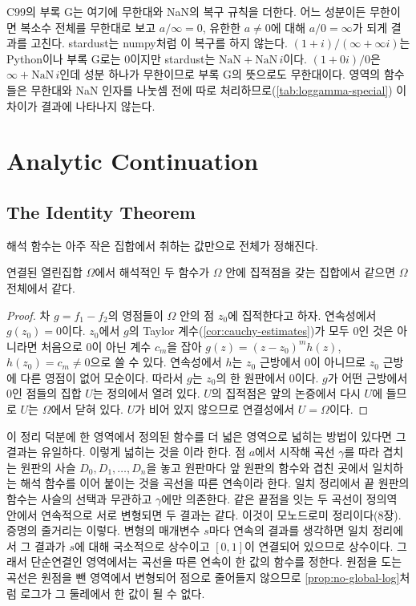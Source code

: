 C99의 부록 G는 여기에 무한대와 NaN의 복구 규칙을 더한다. 어느 성분이든 무한이면 복소수 전체를 무한대로 보고 $a/\infty=0$, 유한한 $a\ne0$에 대해 $a/0=\infty$가 되게 결과를 고친다. stardust는 numpy처럼 이 복구를 하지 않는다. $(1+i)/(\infty+\infty i)$는 Python이나 부록 G로는 $0$이지만 stardust는 $\mathrm{NaN}+\mathrm{NaN}\,i$이다. $(1+0i)/0$은 $\infty+\mathrm{NaN}\,i$인데 성분 하나가 무한이므로 부록 G의 뜻으로도 무한대이다.  영역의 함수들은 무한대와 NaN 인자를 나눗셈 전에 따로 처리하므로(\cref{tab:loggamma-special}) 이 차이가 결과에 나타나지 않는다.


\section{Analytic Continuation}
\label{sec:continuation}

\subsection{The Identity Theorem}

해석 함수는 아주 작은 집합에서 취하는 값만으로 전체가 정해진다.

\begin{theorem}[일치 정리]
\label{thm:identity}
연결된 열린집합 $\Omega$에서 해석적인 두 함수가 $\Omega$ 안에 집적점을 갖는 집합에서 같으면 $\Omega$ 전체에서 같다.
\end{theorem}

\begin{proof}
차 $g=f_1-f_2$의 영점들이 $\Omega$ 안의 점 $z_0$에 집적한다고 하자. 연속성에서 $g(z_0)=0$이다. $z_0$에서 $g$의 Taylor 계수(\cref{cor:cauchy-estimates})가 모두 $0$인 것은 아니라면 처음으로 $0$이 아닌 계수 $c_m$을 잡아 $g(z)=(z-z_0)^mh(z)$, $h(z_0)=c_m\ne0$으로 쓸 수 있다. 연속성에서 $h$는 $z_0$ 근방에서 $0$이 아니므로 $z_0$ 근방에 다른 영점이 없어 모순이다. 따라서 $g$는 $z_0$의 한 원판에서 $0$이다. $g$가 어떤 근방에서 $0$인 점들의 집합 $U$는 정의에서 열려 있다. $U$의 집적점은 앞의 논증에서 다시 $U$에 들므로 $U$는 $\Omega$에서 닫혀 있다. $U$가 비어 있지 않으므로 연결성에서 $U=\Omega$이다.
\end{proof}

이 정리 덕분에 한 영역에서 정의된 함수를 더 넓은 영역으로 넓히는 방법이 있다면 그 결과는 유일하다. 이렇게 넓히는 것을 이라 한다. 점 $a$에서 시작해 곡선 $\gamma$를 따라 겹치는 원판의 사슬 $D_0,D_1,\dots,D_n$을 놓고 원판마다 앞 원판의 함수와 겹친 곳에서 일치하는 해석 함수를 이어 붙이는 것을 곡선을 따른 연속이라 한다. 일치 정리에서 끝 원판의 함수는 사슬의 선택과 무관하고 $\gamma$에만 의존한다. 같은 끝점을 잇는 두 곡선이 정의역 안에서 연속적으로 서로 변형되면 두 결과는 같다. 이것이 모노드로미 정리이다\cite{ahlfors1979complex}(8장). 증명의 줄거리는 이렇다. 변형의 매개변수 $s$마다 연속의 결과를 생각하면 일치 정리에서 그 결과가 $s$에 대해 국소적으로 상수이고 $[0,1]$이 연결되어 있으므로 상수이다. 그래서 단순연결인 영역에서는 곡선을 따른 연속이 한 값의 함수를 정한다. 원점을 도는 곡선은 원점을 뺀 영역에서 변형되어 점으로 줄어들지 않으므로 \cref{prop:no-global-log}처럼 로그가 그 둘레에서 한 값이 될 수 없다.

